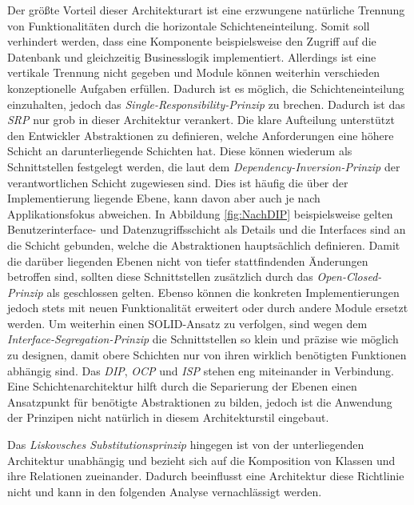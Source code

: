 \documentclass[conference]{IEEEtran}
\begin{document}
Der größte Vorteil dieser Architekturart ist eine erzwungene natürliche Trennung von Funktionalitäten durch die horizontale Schichteneinteilung. Somit soll verhindert werden, dass eine Komponente beispielsweise den Zugriff auf die Datenbank und gleichzeitig Businesslogik implementiert. Allerdings ist eine vertikale Trennung nicht gegeben und Module können weiterhin verschieden konzeptionelle Aufgaben erfüllen. Dadurch ist es möglich, die Schichteneinteilung einzuhalten, jedoch das \emph{Single-Responsibility-Prinzip} zu brechen. Dadurch ist das \emph{SRP} nur grob in dieser Architektur verankert. Die klare Aufteilung unterstützt den Entwickler Abstraktionen zu definieren, welche Anforderungen eine höhere Schicht an darunterliegende Schichten hat. Diese können wiederum als Schnittstellen festgelegt werden, die laut dem \emph{Dependency-Inversion-Prinzip} der verantwortlichen Schicht zugewiesen sind. Dies ist häufig die über der Implementierung liegende Ebene, kann davon aber auch je nach Applikationsfokus abweichen. In Abbildung \ref{fig:NachDIP} beispielsweise gelten Benutzerinterface- und Datenzugriffsschicht als Details und die Interfaces sind an die Schicht gebunden, welche die Abstraktionen hauptsächlich definieren. Damit die darüber liegenden Ebenen nicht von tiefer stattfindenden Änderungen betroffen sind, sollten diese Schnittstellen zusätzlich durch das \emph{Open-Closed-Prinzip} als geschlossen gelten. Ebenso können die konkreten Implementierungen jedoch stets mit neuen Funktionalität erweitert oder durch andere Module ersetzt werden. Um weiterhin einen SOLID-Ansatz zu verfolgen, sind wegen dem \emph{Interface-Segregation-Prinzip} die Schnittstellen so klein und präzise wie möglich zu designen, damit obere Schichten nur von ihren wirklich benötigten Funktionen abhängig sind. Das \emph{DIP}, \emph{OCP} und \emph{ISP} stehen eng miteinander in Verbindung. Eine Schichtenarchitektur hilft durch die Separierung der Ebenen einen Ansatzpunkt für benötigte Abstraktionen zu bilden, jedoch ist die Anwendung der Prinzipen nicht natürlich in diesem Architekturstil eingebaut.  

Das \emph{Liskovsches Substitutionsprinzip} hingegen ist von der unterliegenden Architektur unabhängig und bezieht sich auf die Komposition von Klassen und ihre Relationen zueinander. Dadurch beeinflusst eine Architektur diese Richtlinie nicht und kann in den folgenden Analyse vernachlässigt werden.

\end{document}
